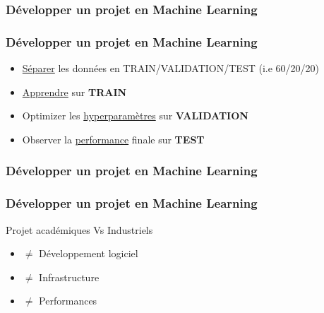 \begin{frame}
  \frametitle{Développer un projet en Machine Learning}
\end{frame}

\begin{frame}
  \frametitle{Développer un projet en Machine Learning}
  \begin{itemize}
  \item \underline{Séparer} les données en TRAIN/VALIDATION/TEST (i.e 60/20/20)
  \item \underline{Apprendre} sur \textbf{TRAIN}
  \item Optimizer les \underline{hyperparamètres} sur \textbf{VALIDATION}
  \item Observer la \underline{performance} finale sur \textbf{TEST}
  \end{itemize}
\end{frame}

\begin{frame}
  \frametitle{Développer un projet en Machine Learning}
\end{frame}

\begin{frame}
  \frametitle{Développer un projet en Machine Learning}
  Projet académiques Vs Industriels
  \begin{itemize}
  \item $\neq$ Développement logiciel
  \item $\neq$ Infrastructure
  \item $\neq$ Performances
  \end{itemize}
\end{frame}

